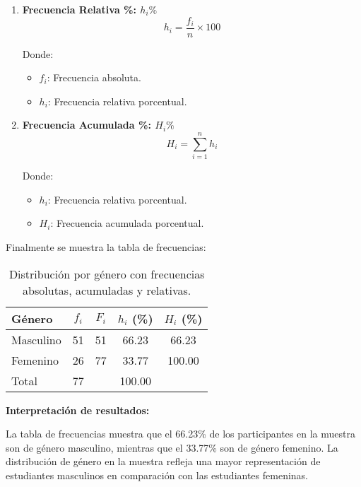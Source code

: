 \begin{multicols}{2}
\begin{enumerate}
    \item \begin{center}
      \textbf{Frecuencia Relativa \%: $h_i\%$}
      \hrulefill
      \begin{equation*}
        h_i = \dfrac{f_i}{n} \times 100
      \end{equation*}
    \end{center}
    \vspace{-1cm}
    Donde:
    \begin{itemize}
        \item $f_i$: Frecuencia absoluta.
        \item $h_i$: Frecuencia relativa porcentual.
    \end{itemize}

    \item \begin{center}
      \textbf{Frecuencia Acumulada \%: $H_i\%$}
      \hrulefill
      \begin{equation*}
        H_i = \sum_{i=1}^{n} h_i
      \end{equation*}
    \end{center}
    \vspace{-1cm}
    Donde:
    \begin{itemize}
        \item $h_i$: Frecuencia relativa porcentual.
        \item $H_i$: Frecuencia acumulada porcentual.
    \end{itemize}
    \end{enumerate}
  \end{multicols}
  \vspace{-0.5cm}
  Finalmente se muestra la tabla de frecuencias:

  \renewcommand{\arraystretch}{1.5} %
\begin{table}[ht]
    \centering
    \begin{tabular}{l @{\hskip 0.5cm} c @{\hskip 0.5cm} c @{\hskip 0.5cm} c @{\hskip 0.5cm} c}
      \hline
      \textbf{Género} & \textbf{$f_i$} & \textbf{$F_i$} & \textbf{$h_i$ (\%)} & \textbf{$H_i$ (\%)} \\ \hline
      Masculino       & 51             & 51             & 66.23               & 66.23               \\ \hline
      Femenino        & 26             & 77             & 33.77               & 100.00              \\ \hline
      Total           & 77             &                & 100.00              &                     \\
    \end{tabular}
    \caption{Distribución por género con frecuencias absolutas, acumuladas y relativas.}
    \label{tab:genero-frecuencias}
\end{table}

\textbf{Interpretación de resultados:}

La tabla de frecuencias muestra que el 66.23\% de los participantes en la muestra son de género masculino, mientras que el 33.77\% son de género femenino. La distribución de género en la muestra refleja una mayor representación de estudiantes masculinos en comparación con las estudiantes femeninas.